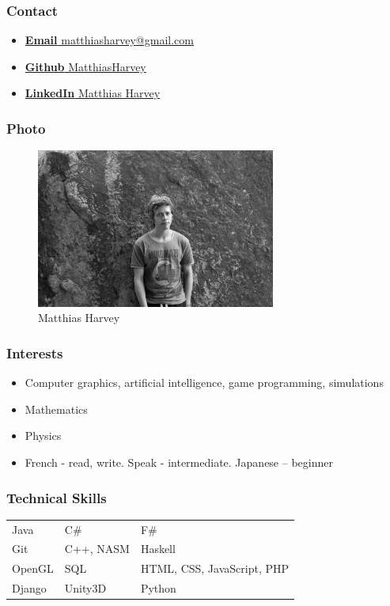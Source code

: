 \documentclass{article}
\begin{document}
\subsubsection{Contact}
\begin{itemize}
	\item \href{mailto:matthiasharvey@gmail.com}{\textbf{Email} matthiasharvey@gmail.com}
	\item \href{https://github.com/MatthiasHarvey}{\textbf{Github} MatthiasHarvey}	
	\item \href{https://za.linkedin.com/in/matthias-harvey-68b30995}{\textbf{LinkedIn} Matthias Harvey}
\end{itemize}
\subsubsection{Photo}
\begin{figure}[H]
	\centering
	\includegraphics[width=0.7\textwidth]{../matthias.jpg}
	\caption{Matthias Harvey}
\end{figure}
\subsubsection{Interests}
\begin{itemize}
	\item Computer graphics, artificial intelligence, game programming, simulations
	\item Mathematics
	\item Physics
	\item French - read, write. Speak - intermediate. Japanese – beginner
\end{itemize}
\subsubsection{Technical Skills}

\begin{tabular}{| l | l | l |}
	Java   & C\#     & F\#                          \\
	Git    & C++, NASM     & Haskell                     \\
	OpenGL & SQL     & HTML, CSS, JavaScript, PHP   \\
	Django & Unity3D & Python                     
\end{tabular}
\end{document}
